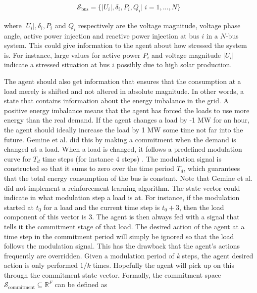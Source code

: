 \documentclass[class=book, crop=false, 11pt]{standalone}
\begin{document}
\begin{equation}
   \begin{aligned}
   \label{eq:problem:bus_state}
\mathcal{S}_{\textrm{bus}} = \{|U_{i}|, \delta_{i}, P_{i}, Q_{i} |\; i = 1,...,N\}
    \end{aligned} 
\end{equation}

where $|U_{i}|,\delta_{i}, P_{i}$ and $Q_{i}$ respectively are the voltage magnitude, voltage phase angle, active power injection and reactive power injection at bus $i$ in a $N$-bus system. This could give information to the agent about how stressed the system is. For instance, large values for active power $P_{i}$ and voltage magnitude $|U_{i}|$ indicate a stressed situation at bus $i$ possibly due to high solar production. 



The agent should also get information that ensures that the consumption at a load merely is shifted and not altered in absolute magnitude. In other words, a state that contains information about the energy imbalance in the grid. A positive energy imbalance means that the agent has forced the loads to use more energy than the real demand. If the agent changes a load by -1 MW for an hour, the agent should ideally increase the load by 1 MW some time not far into the future. Gemine et al. did this by making a commitment when the demand is changed at a load. When a load is changed, it follows a predefined modulation curve for $T_{d}$ time steps (for instance 4 steps) \cite{active_network_management}. The modulation signal is constructed so that it sums to zero over the time period $T_{d}$, which guarantees that the total energy consumption of the bus is constant. Note that Gemine et al. did not implement a reinforcement learning algorithm. The state vector could indicate in what modulation step a load is at. For instance, if the modulation started at $t_{0}$ for a load and the current time step is $t_{0} + 3$, then the load component of this vector is 3. The agent is then always fed with a signal that tells it the commitment stage of that load. The desired action of the agent at a time step in the commitment period will simply be ignored so that the load follows the modulation signal. This has the drawback that the agent's actions frequently are overridden. Given a modulation period of \textit{k} steps, the agent desired action is only performed $1/k$ times. Hopefully the agent will pick up on this through the commitment state vector. Formally, the commitment space $\mathcal{S}_{\textrm{commitment}} \subseteq \mathbb{R}^{F}$ can be defined as
\end{document}
